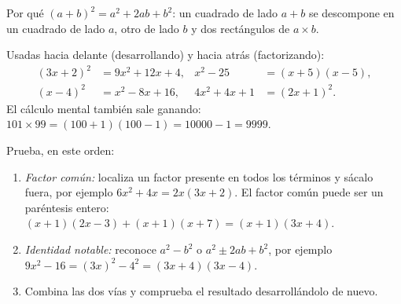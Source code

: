 \begin{omfigure}

{\small Por qué $(a+b)^2 = a^2 + 2ab + b^2$: un cuadrado de lado $a + b$ se
descompone en un cuadrado de lado $a$, otro de lado $b$ y dos rectángulos
de $a \times b$.}
\end{omfigure}

\begin{example}\label{ex:g10:algebra:identities}
Usadas hacia delante (desarrollando) y hacia atrás (factorizando):
\begin{align*}
(3x + 2)^2 &= 9x^2 + 12x + 4,
& x^2 - 25 &= (x+5)(x-5), \\
(x - 4)^2 &= x^2 - 8x + 16,
& 4x^2 + 4x + 1 &= (2x + 1)^2 .
\end{align*}
El cálculo mental también sale ganando: $101 \times 99 = (100+1)(100-1) =
10000 - 1 = 9999$.
\end{example}

\begin{method}\label{met:g10:algebra:factor}
Prueba, en este orden:
\begin{enumerate}
  \item \emph{Factor común:} localiza un factor presente en todos los
        términos y sácalo fuera, por ejemplo $6x^2 + 4x = 2x(3x + 2)$. El
        factor común puede ser un paréntesis entero:
        $(x+1)(2x-3) + (x+1)(x+7) = (x+1)(3x+4)$.
  \item \emph{Identidad notable:} reconoce $a^2 - b^2$ o
        $a^2 \pm 2ab + b^2$, por ejemplo $9x^2 - 16 = (3x)^2 - 4^2 =
        (3x+4)(3x-4)$.
  \item Combina las dos vías y comprueba el resultado desarrollándolo de
        nuevo.
\end{enumerate}
\end{method}

